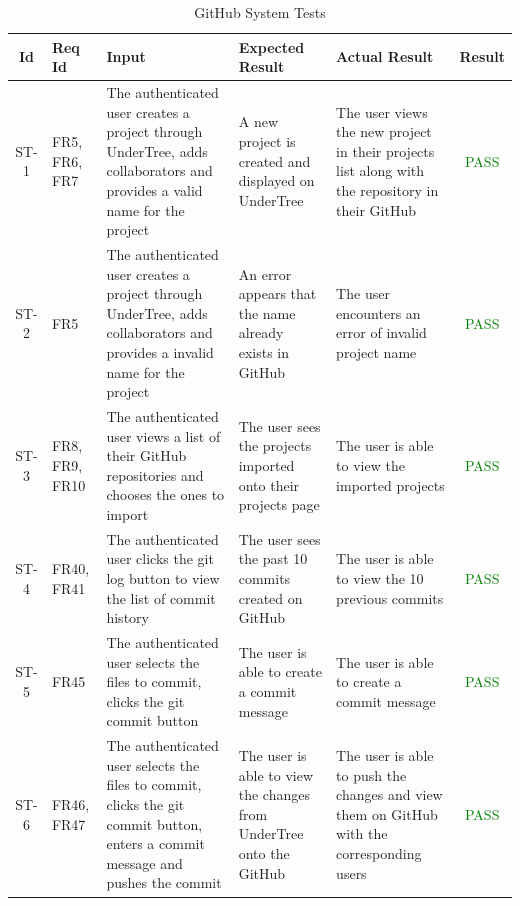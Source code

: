 \documentclass[12pt, titlepage]{article}
\begin{document}
	\begin{center}
		\begin{longtable}{|c|p{1cm}|p{2.7cm}|p{3cm}|p{3cm}|c|}
			\caption{GitHub System Tests \label{long}}\\
			\hline
			\textbf{Id} & \textbf{Req Id} & \textbf{Input} & \textbf{Expected Result} & \textbf{Actual Result} & \textbf{Result}   \\
			\hline
			ST-1 & FR5, FR6, FR7 & The authenticated user creates a project through UnderTree, adds collaborators and provides a valid name for the project & A new project is created and displayed on UnderTree & The user views the new project in their projects list along with the repository in their GitHub & \textcolor{green}{PASS} \\
			\hline
			ST-2 & FR5 & The authenticated user creates a project through UnderTree, adds collaborators and provides a invalid name for the project & An error appears that the name already exists in GitHub & The user encounters an error of invalid project name & \textcolor{green}{PASS} \\
			\hline
			ST-3 & FR8, FR9, FR10 & The authenticated user views a list of their GitHub repositories and chooses the ones to import & The user sees the projects imported onto their projects page & The user is able to view the imported projects & \textcolor{green}{PASS} \\
			\hline
			ST-4 & FR40, FR41 & The authenticated user clicks the git log button to view the list of commit history & The user sees the past 10 commits created on GitHub & The user is able to view the 10 previous commits & \textcolor{green}{PASS} \\
			\hline
			ST-5 & FR45 & The authenticated user selects the files to commit, clicks the git commit button & The user is able to create a commit message & The user is able to create a commit message & \textcolor{green}{PASS} \\
			\hline
			ST-6 & FR46, FR47 & The authenticated user selects the files to commit, clicks the git commit button, enters a commit message and pushes the commit & The user is able to view the changes from UnderTree onto the GitHub & The user is able to push the changes and view them on GitHub with the corresponding users & \textcolor{green}{PASS} \\
			\hline
		\end{longtable}
	\end{center}
	
\end{document}

